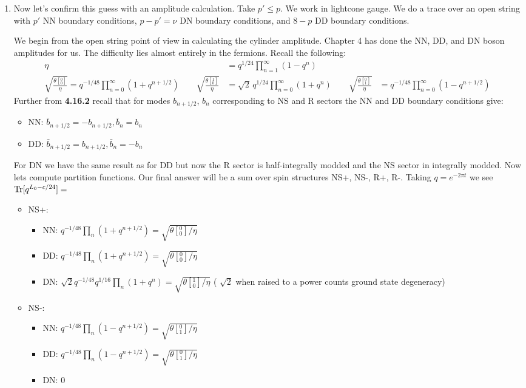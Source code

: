 \documentclass[11pt, class=article, crop=false]{standalone}
\begin{document}
\begin{enumerate}
	\item Now let's confirm this guess with an amplitude calculation. Take $p' \leq p$. We work in lightcone gauge. We do a trace over an open string with $p'$ NN boundary conditions, $p-p' = \nu$ DN boundary conditions, and $8-p$ DD boundary conditions. 
	
	We begin from the open string point of view in calculating the cylinder amplitude. Chapter 4 has done the NN, DD, and DN boson amplitudes for us. The difficulty lies almost entirely in the fermions.
	Recall the following:
	\[
	\begin{aligned}
		\eta &= q^{1/24} \prod_{n=1}^\infty (1-q^n)\\
		 \sqrt{\frac{\theta[{^0_0}]}{\eta}} = q^{-1/48} \prod_{n=0}^\infty (1 + q^{n+1/2}) \qquad 
		 \sqrt{\frac{\theta[{^1_0}]}{\eta}} &= \sqrt 2 \, q^{1/24} \prod_{n=0}^\infty (1 + q^n) \qquad  \sqrt{\frac{\theta[{^0_1}]}{\eta}} &= q^{-1/48} \prod_{n=0}^\infty (1 - q^{n+1/2})
	\end{aligned}
	\]
	Further from \textbf{4.16.2} recall that for modes $b_{n+1/2}$, $b_n$ corresponding to NS and R sectors  the NN and DD boundary conditions give:
	\begin{itemize}
		\item NN: $\bar b_{n+1/2} = - b_{n+1/2}, \bar b_n = b_n$
		\item DD: $\bar b_{n+1/2} = b_{n+1/2}, \bar b_n = -b_n$
	\end{itemize}
	For DN we have the same result as for DD but now the R sector is half-integrally modded and the NS sector in integrally modded. Now lets compute partition functions. Our final answer will be a sum over spin structures NS+, NS-, R+, R-. Taking $q = e^{- 2 \pi t}$ we see $\mathrm{Tr}[q^{L_0 - c/24}] = $
	\begin{itemize}
		\item NS+: 
		\begin{itemize}
			\item NN: $q^{-1/48}\prod_{n} (1 + q^{n+1/2}) =  \sqrt{\theta[{^0_0}]/\eta}$
			\item DD: $q^{-1/48}\prod_{n} (1 + q^{n+1/2}) = \sqrt{\theta[{^0_0}]/\eta}$
			\item DN: $\sqrt{2} q^{-1/48} q^{1/16} \prod_{n} (1 + q^{n}) = \sqrt{\theta[{^1_0}]/\eta}$ ( $\sqrt 2$ when raised to a power counts ground state degeneracy)
		\end{itemize}
%
		\item NS-: 
		\begin{itemize}
			\item NN: $q^{-1/48}\prod_{n} (1 - q^{n+1/2}) =  \sqrt{\theta[{^0_1}]/\eta}$
			\item DD: $q^{-1/48}\prod_{n} (1 - q^{n+1/2}) = \sqrt{\theta[{^0_1}]/\eta}$
			\item DN: $0$
		\end{itemize}
		

\end{itemize}
\end{enumerate}
\end{document}
